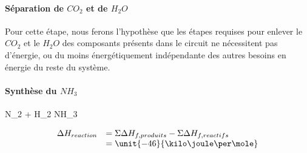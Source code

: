 \documentclass{article}
\begin{document}

\paragraph{S\'eparation de $CO_{2}$ et de $H_{2}O$}		

Pour cette \'etape, nous ferons l'hypoth\`{e}se que les \'etapes requises pour enlever le $CO_{2}$ et le $H_{2}O$ des composants pr\'esents dans le circuit ne n\'ecessitent pas d'\'energie, ou du moins \'energ\'etiquement ind\'ependante des autres besoins en \'energie du reste du syst\`{e}me.

\paragraph{Synth\`{e}se du $NH_{3}$}		

\begin{chemmath}
		N_{2} + H_2 \Longrightarrow NH_3 
\end{chemmath}	

$$
	\begin{array}{rl}
	\Delta H_{reaction}		&= \Sigma \Delta H_{f,produits} - \Sigma \Delta H_{f,reactifs} \\
												&= \unit{-46}{\kilo\joule\per\mole}
	\end{array}
$$
\end{document}
